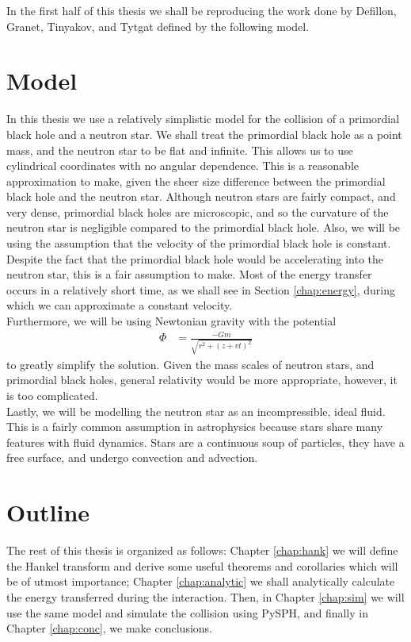 In the first half of this thesis we shall be reproducing the work done by Defillon, Granet, Tinyakov, and Tytgat \cite{tidalcapture} defined by the following model.

\section{Model}

In this thesis we use a relatively simplistic model for the collision of a primordial black hole and a neutron star. We shall treat the primordial black hole as a point mass, and the neutron star to be flat and infinite. This allows us to use cylindrical coordinates with no angular dependence. This is a reasonable approximation to make, given the sheer size difference between the primordial black hole and the neutron star. Although neutron stars are fairly compact, and very dense, primordial black holes are microscopic, and so the curvature of the neutron star is negligible compared to the primordial black hole. Also, we will be using the assumption that the velocity of the primordial black hole is constant. Despite the fact that the primordial black hole would be accelerating into the neutron star, this is a fair assumption to make. Most of the energy transfer occurs in a relatively short time, as we shall see in Section \ref{chap:energy}, during which we can approximate a constant velocity. \\

Furthermore, we will be using Newtonian gravity with the potential
\begin{align}
\label{eq:gravity}
\Phi &= \frac{-Gm}{\sqrt{r^2 + (z + vt)^2}}
\end{align}
to greatly simplify the solution. Given the mass scales of neutron stars, and primordial black holes, general relativity would be more appropriate, however, it is too complicated. \\

Lastly, we will be modelling the neutron star as an incompressible, ideal fluid. This is a fairly common assumption in astrophysics because stars share many features with fluid dynamics. Stars are a continuous soup of particles, they have a free surface, and undergo convection and advection.

\section{Outline}

The rest of this thesis is organized as follows: Chapter \ref{chap:hank} we will define the Hankel transform and derive some useful theorems and corollaries which will be of utmost importance; Chapter \ref{chap:analytic} we shall analytically calculate the energy transferred during the interaction. Then, in Chapter \ref{chap:sim} we will use the same model and simulate the collision using PySPH, and finally in Chapter \ref{chap:conc}, we make conclusions.


%
